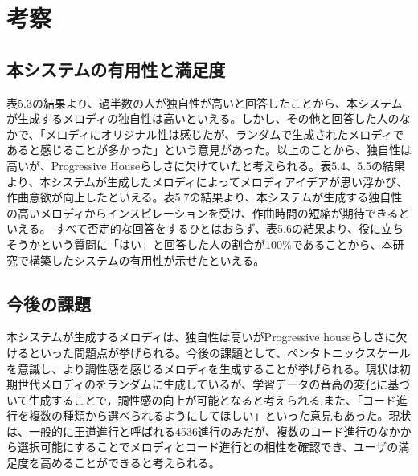 \chapter{考察}
\section{本システムの有用性と満足度}
表5.3の結果より、過半数の人が独自性が高いと回答したことから、本システムが生成するメロディの独自性は高いといえる。しかし、その他と回答した人のなかで、「メロディにオリジナル性は感じたが、ランダムで生成されたメロディであると感じることが多かった」という意見があった。以上のことから、独自性は高いが、Progressive Houseらしさに欠けていたと考えられる。表5.4、5.5の結果より、本システムが生成したメロディによってメロディアイデアが思い浮かび、作曲意欲が向上したといえる。表5.7の結果より、本システムが生成する独自性の高いメロディからインスピレーションを受け、作曲時間の短縮が期待できるといえる。
すべて否定的な回答をするひとはおらず、表5.6の結果より、役に立ちそうかという質問に「はい」と回答した人の割合が100\%であることから、本研究で構築したシステムの有用性が示せたといえる。
\section{今後の課題}
本システムが生成するメロディは、独自性は高いがProgressive houseらしさに欠けるといった問題点が挙げられる。今後の課題として、ペンタトニックスケールを意識し、より調性感\cite{Hoshino84}を感じるメロディを生成することが挙げられる。現状は初期世代メロディのをランダムに生成しているが、学習データの音高の変化に基づいて生成することで，調性感の向上が可能となると考えられる.また、「コード進行を複数の種類から選べられるようにしてほしい」といった意見もあった。現状は、一般的に王道進行と呼ばれる4536進行のみだが、複数のコード進行のなかから選択可能にすることでメロディとコード進行との相性を確認でき、ユーザの満足度を高めることができると考えられる。
